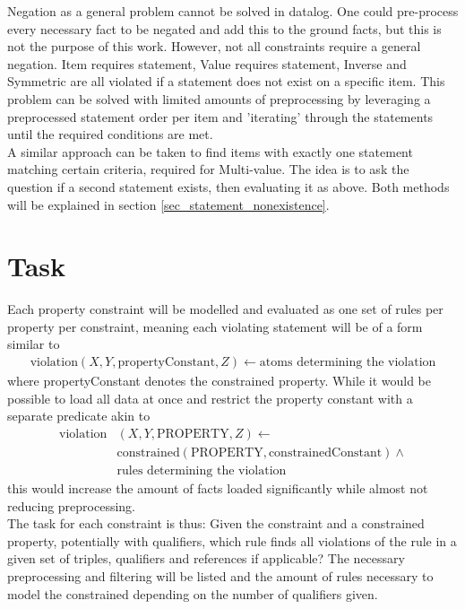 \documentclass[hyperref,bachelorofscience,fleqn]{cgvpub}
\begin{document}
Negation as a general problem cannot be solved in datalog. One could pre-process every necessary fact to be negated and add this to the ground facts, but this is not the purpose of this work. However, not all constraints require a general negation. Item requires statement, Value requires statement, Inverse and Symmetric are all violated if a statement does not exist on a specific item. This problem can be solved with limited amounts of preprocessing by leveraging a preprocessed statement order per item and 'iterating' through the statements until the required conditions are met.\\
A similar approach can be taken to find items with exactly one statement matching certain criteria, required for 	Multi-value. The idea is to ask the question if a second statement exists, then evaluating it as above. Both methods will be explained in section \ref{sec_statement_nonexistence}.

\section{Task}
Each property constraint will be modelled and evaluated as one set of rules per property per constraint, meaning each violating statement will be of a form similar to
\begin{equation}
\begin{split}
\text{violation}(X, Y, \text{propertyConstant}, Z) \leftarrow \text{atoms determining the violation}
\end{split}
\end{equation}
where propertyConstant denotes the constrained property. While it would be possible to load all data at once and restrict the property constant with a separate predicate akin to
\begin{equation}
\begin{split}
\text{violation}&(X, Y, \text{PROPERTY}, Z) \leftarrow \\
&\text{constrained}(\text{PROPERTY}, \text{constrainedConstant}) \wedge\\
&\text{rules determining the violation}
\end{split}
\end{equation}
this would increase the amount of facts loaded significantly while almost not reducing preprocessing.\\

The task for each constraint is thus: Given the constraint and a constrained property, potentially with qualifiers, which rule finds all violations of the rule in a given set of triples, qualifiers and references if applicable? The necessary preprocessing and filtering will be listed and the amount of rules necessary to model the constrained depending on the number of qualifiers given.
\end{document}
